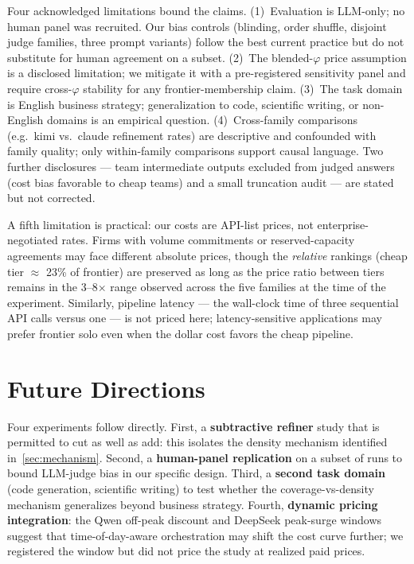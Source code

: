 \documentclass[12pt,a4paper]{article}
\newcommand{\phiBlend}{\varphi}
\begin{document}
Four acknowledged limitations bound the claims. (1)~Evaluation is LLM-only; no
human panel was recruited. Our bias controls (blinding, order shuffle, disjoint
judge families, three prompt variants) follow the best current practice
\citep{ZhengEtAl2023, VergaEtAl2024} but do not substitute for human agreement
on a subset. (2)~The blended-$\phiBlend$ price assumption is a disclosed
limitation; we mitigate it with a pre-registered sensitivity panel and require
cross-$\phiBlend$ stability for any frontier-membership claim. (3)~The task
domain is English business strategy; generalization to code, scientific writing,
or non-English domains is an empirical question. (4)~Cross-family comparisons
(e.g.\ kimi vs.\ claude refinement rates) are descriptive and confounded with
family quality; only within-family comparisons support causal language. Two
further disclosures --- team intermediate outputs excluded from judged answers
(cost bias favorable to cheap teams) and a small truncation audit --- are stated
but not corrected.

A fifth limitation is practical: our costs are API-list prices, not
enterprise-negotiated rates. Firms with volume commitments or reserved-capacity
agreements may face different absolute prices, though the \emph{relative}
rankings (cheap tier $\approx$ 23\% of frontier) are preserved as long as the
price ratio between tiers remains in the 3--8$\times$ range observed across the
five families at the time of the experiment. Similarly, pipeline latency --- the
wall-clock time of three sequential API calls versus one --- is not priced here;
latency-sensitive applications may prefer frontier solo even when the dollar
cost favors the cheap pipeline.

\section{Future Directions}\label{sec:future}

Four experiments follow directly. First, a \textbf{subtractive refiner} study
that is permitted to cut as well as add: this isolates the density mechanism
identified in~\cref{sec:mechanism}. Second, a \textbf{human-panel replication}
on a subset of runs to bound LLM-judge bias in our specific design. Third, a
\textbf{second task domain} (code generation, scientific writing) to test
whether the coverage-vs-density mechanism generalizes beyond business strategy.
Fourth, \textbf{dynamic pricing integration}: the Qwen off-peak discount and
DeepSeek peak-surge windows suggest that time-of-day-aware orchestration may
shift the cost curve further; we registered the window but did not price the
study at realized paid prices.
\end{document}
